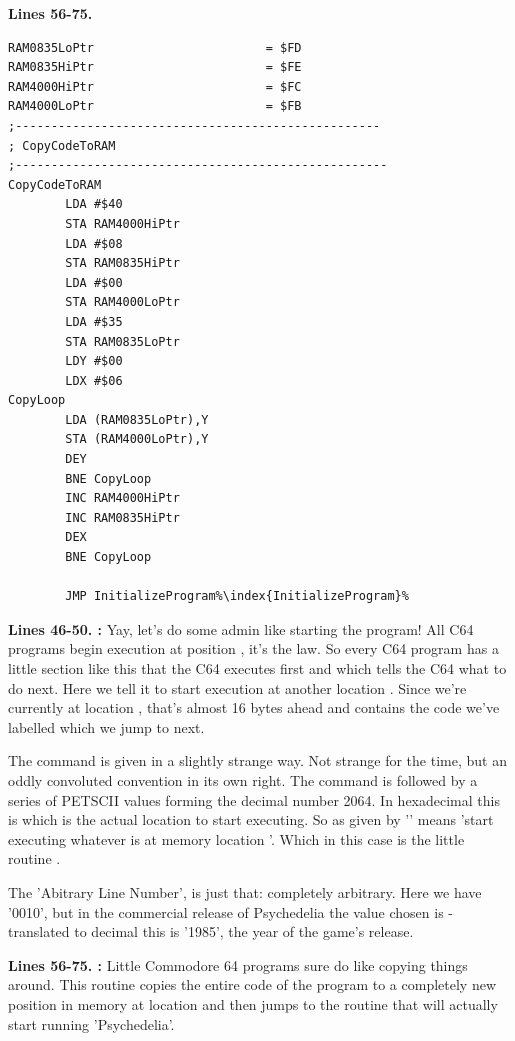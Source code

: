 \textbf{Lines 56-75. }
\begin{lstlisting}[caption=Some strictly unnecessary code copying,escapechar=\%]
RAM0835LoPtr                        = $FD
RAM0835HiPtr                        = $FE
RAM4000HiPtr                        = $FC
RAM4000LoPtr                        = $FB
;---------------------------------------------------
; CopyCodeToRAM
;----------------------------------------------------
CopyCodeToRAM
        LDA #$40
        STA RAM4000HiPtr
        LDA #$08
        STA RAM0835HiPtr
        LDA #$00
        STA RAM4000LoPtr
        LDA #$35
        STA RAM0835LoPtr
        LDY #$00                                 
        LDX #$06
CopyLoop   
        LDA (RAM0835LoPtr),Y
        STA (RAM4000LoPtr),Y
        DEY 
        BNE CopyLoop
        INC RAM4000HiPtr
        INC RAM0835HiPtr
        DEX 
        BNE CopyLoop

        JMP InitializeProgram%\index{InitializeProgram}%

\end{lstlisting}
\clearpage
{}
\textbf{Lines 46-50. :} Yay, let's do some admin like starting the program! All C64 programs 
begin execution at position , it's the law.
So every C64 program has a little section like this that the C64 executes first and which tells the C64 what to do next.
Here we tell it to start execution at another location . Since we're currently at location , that's
almost 16 bytes ahead and contains the code we've labelled  which we jump to next.

The command is given in a slightly strange way. Not strange for the time, but an oddly convoluted convention in its own right.
The  command is followed by a series of PETSCII values forming the decimal number 2064. In hexadecimal this is
 which is the actual location to start executing. So  as given by ''
means 'start executing whatever is at memory location '. Which in this case is the little routine .

The 'Abitrary Line Number', is just that: completely arbitrary. Here we have '0010', but in the commercial release of Psychedelia
the value chosen is  - translated to decimal this is '1985', the year of the game's release.

\bigskip
\bigskip
\textbf{Lines 56-75. :} Little Commodore 64 programs sure do like copying things around. This routine copies the entire code of the program to a
completely new position in memory at location  and then jumps to the routine  that will actually start running
'Psychedelia'.

